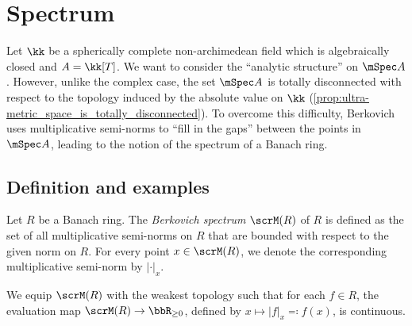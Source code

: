 \section{Spectrum}




    Let \(\kk\) be a spherically complete non-archimedean field which is algebraically closed and \(A = \kk[T]\).
    We want to consider the ``analytic structure'' on \(\mSpec A\).
    However, unlike the complex case, the set \(\mSpec A\) is totally disconnected with respect to the topology induced by the absolute value on \(\kk\) (\cref{prop:ultra-metric_space_is_totally_disconnected}).
    To overcome this difficulty, Berkovich uses multiplicative semi-norms to ``fill in the gaps'' between the points in \(\mSpec A\), leading to the notion of the spectrum of a Banach ring.


\subsection{Definition and examples}

    \begin{definition}\label{def:spectrum_of_Banach_rings}
        Let \(R\) be a Banach ring.
        The \emph{Berkovich spectrum} \(\scrM(R)\) of \(R\) is defined as the set of all multiplicative semi-norms on \(R\) that are bounded with respect to the given norm on \(R\).
        For every point \(x \in \scrM(R)\), we denote the corresponding multiplicative semi-norm by \(|\cdot|_x\).
        
        We equip \(\scrM(R)\) with the weakest topology such that for each \(f \in R\), the evaluation map \(\scrM(R) \to \bbR_{\geq 0}\), defined by \(x \mapsto |f|_x\eqqcolon f(x)\), is continuous.
    \end{definition}
    
